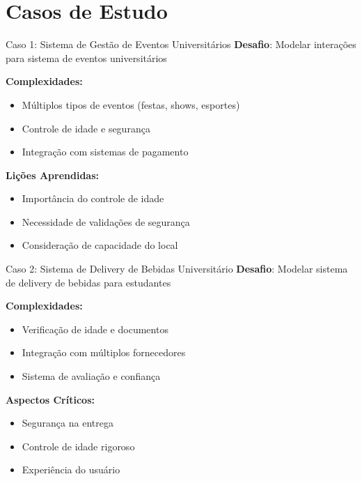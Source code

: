 \documentclass[aspectratio=169]{beamer}
\begin{document}
\section{Casos de Estudo}

\begin{frame}{Caso 1: Sistema de Gestão de Eventos Universitários}
\textbf{Desafio}: Modelar interações para sistema de eventos universitários

\textbf{Complexidades:}
\begin{itemize}
\item Múltiplos tipos de eventos (festas, shows, esportes)
\item Controle de idade e segurança
\item Integração com sistemas de pagamento
\end{itemize}

\vspace{0.5cm}
\textbf{Lições Aprendidas:}
\begin{itemize}
\item Importância do controle de idade
\item Necessidade de validações de segurança
\item Consideração de capacidade do local
\end{itemize}
\end{frame}

\begin{frame}{Caso 2: Sistema de Delivery de Bebidas Universitário}
\textbf{Desafio}: Modelar sistema de delivery de bebidas para estudantes

\textbf{Complexidades:}
\begin{itemize}
\item Verificação de idade e documentos
\item Integração com múltiplos fornecedores
\item Sistema de avaliação e confiança
\end{itemize}

\vspace{0.5cm}
\textbf{Aspectos Críticos:}
\begin{itemize}
\item Segurança na entrega
\item Controle de idade rigoroso
\item Experiência do usuário
\end{itemize}
\end{frame}

\end{document}
